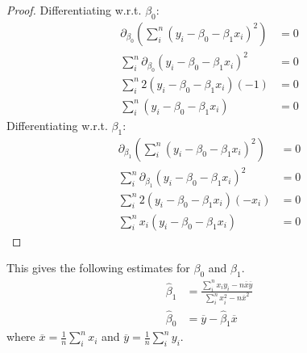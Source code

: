 \documentclass{article}
\begin{document}
\begin{proof}
    Differentiating w.r.t. $\beta_0$:
    \begin{align*}
        \partial_{\beta_0}\left( \sum_i^n \left( y_i - \beta_0 - \beta_1 x_i \right)^2 \right) & = 0 \\
        \sum_i^n \partial_{\beta_0} \left( y_i - \beta_0 - \beta_1 x_i \right)^2               & = 0 \\
        \sum_i^n 2 \left( y_i - \beta_0 - \beta_1 x_i \right)\left( -1 \right)                 & = 0 \\
        \sum_i^n \left( y_i - \beta_0 - \beta_1 x_i \right)                                    & = 0
    \end{align*}
    Differentiating w.r.t. $\beta_1$:
    \begin{align*}
        \partial_{\beta_1}\left( \sum_i^n \left( y_i - \beta_0 - \beta_1 x_i \right)^2 \right) & = 0 \\
        \sum_i^n \partial_{\beta_1} \left( y_i - \beta_0 - \beta_1 x_i \right)^2               & = 0 \\
        \sum_i^n 2 \left( y_i - \beta_0 - \beta_1 x_i \right)\left( -x_i \right)               & = 0 \\
        \sum_i^n x_i \left( y_i - \beta_0 - \beta_1 x_i \right)                                & = 0
    \end{align*}
\end{proof}
This gives the following estimates for $\beta_0$ and $\beta_1$.
\begin{align*}
    \hat{\beta}_1 & = \frac{\sum_i^n x_iy_i - n\overline{x}\overline{y}}{\sum_i^nx_i^2 - n\overline{x}^2} \\
    \hat{\beta}_0 & = \overline{y} - \hat{\beta}_1\overline{x}
\end{align*}
where $\overline{x} = \frac{1}{n}\sum_i^n x_i$ and $\overline{y} = \frac{1}{n}\sum_i^n y_i$.
\end{document}
